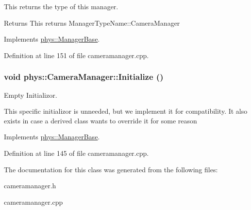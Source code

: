 This returns the type of this manager. 

\begin{DoxyReturn}{Returns}
This returns ManagerTypeName::CameraManager 
\end{DoxyReturn}


Implements \hyperlink{classphys_1_1ManagerBase_aff400b6599db635e24796d8221e9a0e3}{phys::ManagerBase}.



Definition at line 151 of file cameramanager.cpp.

\hypertarget{classphys_1_1CameraManager_a5e956b61fa341ae576d8d160da518488}{
\subsubsection[{Initialize}]{\setlength{\rightskip}{0pt plus 5cm}void phys::CameraManager::Initialize ()}}
\label{d9/d91/classphys_1_1CameraManager_a5e956b61fa341ae576d8d160da518488}


Empty Initializor. 

This specific initializor is unneeded, but we implement it for compatibility. It also exists in case a derived class wants to override it for some reason 

Implements \hyperlink{classphys_1_1ManagerBase_a57dd8e54e767427d5bdcc86dc66d73ed}{phys::ManagerBase}.



Definition at line 145 of file cameramanager.cpp.



The documentation for this class was generated from the following files:\begin{DoxyCompactItemize}
\item 
cameramanager.h\item 
cameramanager.cpp\end{DoxyCompactItemize}
